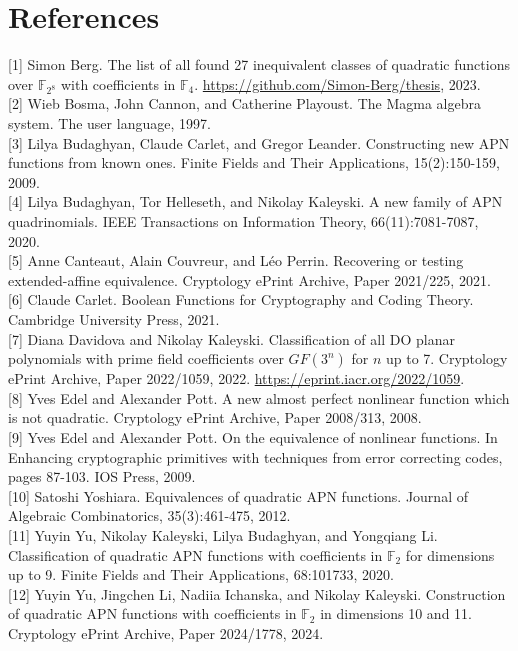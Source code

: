 \documentclass[10pt]{article}
\begin{document}
\section*{References}
[1] Simon Berg. The list of all found 27 inequivalent classes of quadratic functions over $\mathbb{F}_{2^{8}}$ with coefficients in $\mathbb{F}_{4}$. \href{https://github.com/Simon-Berg/thesis}{https://github.com/Simon-Berg/thesis}, 2023.\\[0pt]
[2] Wieb Bosma, John Cannon, and Catherine Playoust. The Magma algebra system. The user language, 1997.\\[0pt]
[3] Lilya Budaghyan, Claude Carlet, and Gregor Leander. Constructing new APN functions from known ones. Finite Fields and Their Applications, 15(2):150-159, 2009.\\[0pt]
[4] Lilya Budaghyan, Tor Helleseth, and Nikolay Kaleyski. A new family of APN quadrinomials. IEEE Transactions on Information Theory, 66(11):7081-7087, 2020.\\[0pt]
[5] Anne Canteaut, Alain Couvreur, and Léo Perrin. Recovering or testing extended-affine equivalence. Cryptology ePrint Archive, Paper 2021/225, 2021.\\[0pt]
[6] Claude Carlet. Boolean Functions for Cryptography and Coding Theory. Cambridge University Press, 2021.\\[0pt]
[7] Diana Davidova and Nikolay Kaleyski. Classification of all DO planar polynomials with prime field coefficients over $G F\left(3^{n}\right)$ for $n$ up to 7. Cryptology ePrint Archive, Paper 2022/1059, 2022. \href{https://eprint.iacr.org/2022/1059}{https://eprint.iacr.org/2022/1059}.\\[0pt]
[8] Yves Edel and Alexander Pott. A new almost perfect nonlinear function which is not quadratic. Cryptology ePrint Archive, Paper 2008/313, 2008.\\[0pt]
[9] Yves Edel and Alexander Pott. On the equivalence of nonlinear functions. In Enhancing cryptographic primitives with techniques from error correcting codes, pages 87-103. IOS Press, 2009.\\[0pt]
[10] Satoshi Yoshiara. Equivalences of quadratic APN functions. Journal of Algebraic Combinatorics, 35(3):461-475, 2012.\\[0pt]
[11] Yuyin Yu, Nikolay Kaleyski, Lilya Budaghyan, and Yongqiang Li. Classification of quadratic APN functions with coefficients in $\mathbb{F}_{2}$ for dimensions up to 9. Finite Fields and Their Applications, 68:101733, 2020.\\[0pt]
[12] Yuyin Yu, Jingchen Li, Nadiia Ichanska, and Nikolay Kaleyski. Construction of quadratic APN functions with coefficients in $\mathbb{F}_{2}$ in dimensions 10 and 11. Cryptology ePrint Archive, Paper 2024/1778, 2024.\\[0pt]
\end{document}
